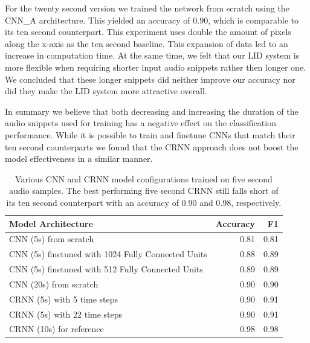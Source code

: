 For the twenty second version we trained the network from scratch using the CNN\_A architecture. This yielded an accuracy of 0.90, which is comparable to its ten second counterpart. This experiment uses double the amount of pixels along the x-axis as the ten second baseline. This expansion of data led to an increase in computation time. At the same time, we felt that our LID system is more flexible when requiring shorter input audio snippets rather then longer one. We concluded that these longer snippets did neither improve our accuracy nor did they make the LID system more attractive overall.

In summary we believe that both decreasing and increasing the duration of the audio snippets used for training has a negative effect on the classification performance. While it is possible to train and finetune CNNs that match their ten second counterparts we found that the CRNN approach does not boost the model effectiveness in a similar manner.
	
	\begin{table}[]
	\centering
	\begin{tabularx}{\textwidth}{lrr}
	\toprule
  Model Architecture                            & Accuracy  & F1   \\ \midrule
  CNN (5s) from scratch                              & 0.81      & 0.81 \\
  CNN (5s) finetuned with 1024 Fully Connected Units & 0.88      & 0.89 \\
  CNN (5s) finetuned with 512 Fully Connected Units  & 0.89      & 0.89 \\
  CNN (20s) from scratch                             & 0.90      & 0.90 \\
  CRNN (5s) with 5 time steps                        & 0.90      & 0.91 \\
  CRNN (5s) with 22 time steps                       & 0.90      & 0.91 \\ \midrule
  CRNN (10s) for reference                           & 0.98      & 0.98 \\ 
 	\bottomrule
	\end{tabularx}
	\caption{Various CNN and CRNN model configurations trained on five second audio samples. The best performing five second CRNN still falls short of its ten second counterpart with an accuracy of 0.90 and 0.98, respectively.}
	\label{tab:audio_duration}
	\end{table}


